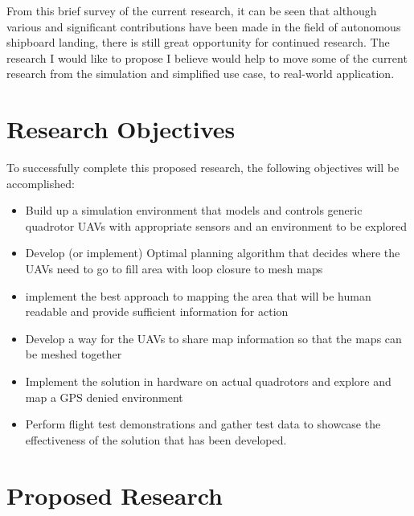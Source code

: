 \documentclass[12pt, letterpaper]{article}
\begin{document}

From this brief survey of the current research, it can be seen that although various and significant contributions have been made in the field of autonomous shipboard landing, there is still great opportunity for continued research.  The research I would like to propose I believe would help to move some of the current research from the simulation and simplified use case, to real-world application.

\section{Research Objectives}

To successfully complete this proposed research, the following objectives will be accomplished:


\begin{itemize}

	\item Build up a simulation environment that models and controls generic quadrotor UAVs with appropriate sensors and an environment to be explored

	\item Develop (or implement) Optimal planning algorithm that decides where the UAVs need to go to fill area with loop closure to mesh maps  

	\item implement the best approach to mapping the area that will be human readable and provide sufficient information for action
	
	\item Develop a way for the UAVs to share map information so that the maps can be meshed together 

	\item Implement the solution in hardware on actual quadrotors and explore and map a GPS denied environment
	
	\item Perform flight test demonstrations and gather test data to showcase the effectiveness of the solution that has been developed.

\end{itemize}

\section{Proposed Research}
\end{document}
